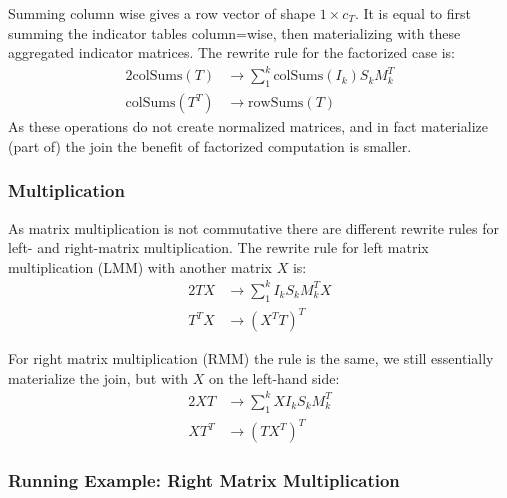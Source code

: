 Summing column wise gives a row vector of shape $1 \times c_T$. It is equal to first summing the indicator tables column=wise, then materializing with these aggregated indicator matrices.  The rewrite rule for the factorized case is:
\begin{alignat*}{2}
    \text{colSums}(T)   & \rightarrow \sum_1^k \text{colSums}(I_k) S_k M_k^T \\
    \text{colSums}(T^T) & \rightarrow \text{rowSums}(T)
\end{alignat*}
As these operations do not create normalized matrices, and in fact materialize (part of) the join the benefit of factorized computation is smaller.

\subsubsection{Multiplication}
As matrix multiplication is not commutative there are different rewrite rules for left- and right-matrix multiplication. The rewrite rule for left matrix multiplication (LMM) with another matrix $X$ is:
\begin{alignat*}{2}
    TX   & \rightarrow \sum_1^k I_k S_k M_k^T X \\
    T^TX & \rightarrow (X^TT)^T
\end{alignat*}

For right matrix multiplication (RMM) the rule is the same, we still essentially materialize the join, but with $X$ on the left-hand side:
\begin{alignat*}{2}
    XT   & \rightarrow \sum_1^k X I_k S_k M_k^T \\
    XT^T & \rightarrow (TX^T)^T
\end{alignat*}



\subsubsection{Running Example: Right Matrix Multiplication}

